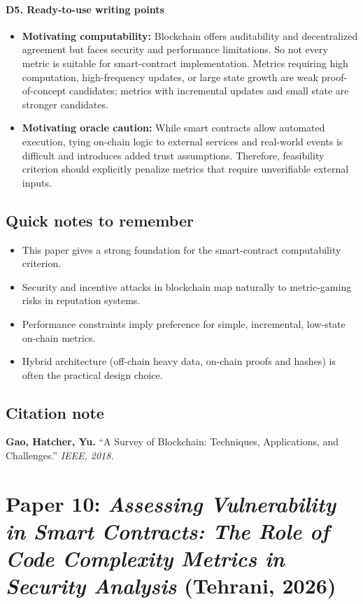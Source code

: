\documentclass[11pt,a4paper]{article}
\begin{document}
\paragraph{D5. Ready-to-use writing points}
\begin{itemize}[leftmargin=*]
  \item \textbf{Motivating computability:} Blockchain offers auditability and decentralized agreement but faces security and performance limitations. So not every metric is suitable for smart-contract implementation. Metrics requiring high computation, high-frequency updates, or large state growth are weak proof-of-concept candidates; metrics with incremental updates and small state are stronger candidates.
  \item \textbf{Motivating oracle caution:} While smart contracts allow automated execution, tying on-chain logic to external services and real-world events is difficult and introduces added trust assumptions. Therefore, feasibility criterion should explicitly penalize metrics that require unverifiable external inputs.
\end{itemize}

\subsection{Quick notes to remember}
\begin{itemize}[leftmargin=*]
  \item This paper gives a strong foundation for the smart-contract computability criterion.
  \item Security and incentive attacks in blockchain map naturally to metric-gaming risks in reputation systems.
  \item Performance constraints imply preference for simple, incremental, low-state on-chain metrics.
  \item Hybrid architecture (off-chain heavy data, on-chain proofs and hashes) is often the practical design choice.
\end{itemize}

\subsection{Citation note}
\noindent\textbf{Gao, Hatcher, Yu.} ``A Survey of Blockchain: Techniques, Applications, and Challenges.'' \textit{IEEE, 2018.}

\newpage
\section{Paper 10: \textit{Assessing Vulnerability in Smart Contracts: The Role of Code Complexity Metrics in Security Analysis} (Tehrani, 2026)}
\end{document}
